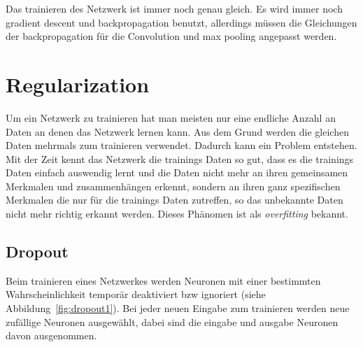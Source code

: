 \documentclass[12pt,a4paper]{report}
\begin{document}
Das trainieren des Netzwerk ist immer noch genau gleich.
Es wird immer noch gradient descent und backpropagation benutzt,
allerdings müssen die Gleichungen der backpropagation für die Convolution und max pooling angepasst werden.

\section{Regularization}
Um ein Netzwerk zu trainieren hat man meisten nur eine endliche Anzahl an Daten an denen das Netzwerk lernen kann.
Aus dem Grund werden die gleichen Daten mehrmals zum trainieren verwendet.
Dadurch kann ein Problem entstehen.
Mit der Zeit kennt das Netzwerk die trainings Daten so gut, dass es die trainings Daten einfach auswendig lernt
und die Daten nicht mehr an ihren gemeinsamen Merkmalen und zusammenhängen erkennt,
sondern an ihren ganz spezifischen Merkmalen die nur für die trainings Daten zutreffen,
so das unbekannte Daten nicht mehr richtig erkannt werden.
Dieses Phänomen ist als \textit{overfitting} bekannt.
\subsection{Dropout}
Beim trainieren eines Netzwerkes werden Neuronen mit einer bestimmten Wahrscheinlichkeit temporär deaktiviert bzw ignoriert (siehe Abbildung~\ref{fig:dropout1}).
Bei jeder neuen Eingabe zum trainieren werden neue zufällige Neuronen ausgewählt,
dabei sind die eingabe und ausgabe Neuronen davon ausgenommen.
\end{document}
